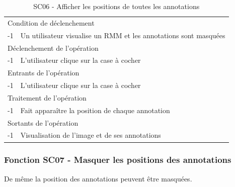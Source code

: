 \documentclass[a4paper]{article}
\begin{document}
\begin{table}[H]
  \centering
   \small
	\begin{tabular}{|c|p{12cm}|}
   		\hline
   			\rowcolor{lightgray}\multicolumn{2}{|c|}{\textbf{SC06 - Afficher les positions de toutes les annotations}} \\
   		\hline
   			\multicolumn{2}{|l|}{Condition de d\'eclenchement} \\
   		\hline
   			-1 & Un utilisateur visualise un RMM et les annotations sont masquées\\
   		\hline
   			\multicolumn{2}{|l|}{D\'eclenchement de l'op\'eration} \\
   		\hline
   			-1 & L’utilisateur clique sur la case à cocher\\
   		\hline
   			\multicolumn{2}{|l|}{Entrants de l'op\'eration} \\
   		\hline
   			-1 & L’utilisateur clique sur la case à cocher\\
   		\hline
   			\multicolumn{2}{|l|}{Traitement de l'op\'eration} \\
  		\hline
   			-1 & Fait apparaître la position de chaque annotation\\
   		\hline
   			\multicolumn{2}{|l|}{Sortants de l'op\'eration} \\
   		\hline
   			-1 & Visualisation de l’image et de ses annotations\\
   		\hline
	\end{tabular}
  \caption{SC06 - Afficher les positions de toutes les annotations}
  \normalsize
  \label{tab:visualiser_position_annotation}
\end{table}

\subsubsection{Fonction SC07 - Masquer les positions des annotations}
De même la position des annotations peuvent être masquées.\\
\end{document}
